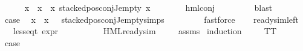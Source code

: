 \begin{isabellebody}
\ \ \ \ \isamarkupfalse%
\ {\isachardoublequoteopen}{\isasymforall}x\ {\isasymin}\ x{}\ {\isacharbackquote}{\kern0pt}\ x{}{\isachardot}{\kern0pt}\ stacked{\isacharunderscore}{\kern0pt}pos{\isacharunderscore}{\kern0pt}conj{\isacharunderscore}{\kern0pt}J{\isacharunderscore}{\kern0pt}empty\ x{\isachardoublequoteclose}\isanewline
\ \ \ \ \ \ \isamarkupfalse%
\ hml{\isacharunderscore}{\kern0pt}conj\ \isanewline
\ \ \ \ \ \ \isamarkupfalse%
\ blast\isanewline
\ \ \ \ \isamarkupfalse%
\ \isamarkupfalse%
\ {\isacharquery}{\kern0pt}case\ \isamarkupfalse%
\ {\isacartoucheopen}x{}\ {\isacharbackquote}{\kern0pt}\ x{}\ {\isacharequal}{\kern0pt}\ {\isacharbraceleft}{\kern0pt}{\isacharbraceright}{\kern0pt}{\isacartoucheclose}\ stacked{\isacharunderscore}{\kern0pt}pos{\isacharunderscore}{\kern0pt}conj{\isacharunderscore}{\kern0pt}J{\isacharunderscore}{\kern0pt}empty{\isachardot}{\kern0pt}simps\ \isanewline
\ \ \ \ \ \ \isamarkupfalse%
\ fastforce\isanewline
\ \ \isamarkupfalse%
\isanewline
{}\isamarkupfalse%
%
\endisatagproof
{\isafoldproof}%
%
\isadelimproof
\isanewline
%
\endisadelimproof
\isanewline
{}\isamarkupfalse%
\ ready{\isacharunderscore}{\kern0pt}sim{\isacharunderscore}{\kern0pt}left{\isacharcolon}{\kern0pt}\isanewline
\ \ \ {\isachardoublequoteopen}less{\isacharunderscore}{\kern0pt}eq{\isacharunderscore}{\kern0pt}t\ {\isacharparenleft}{\kern0pt}expr\ {\isasymphi}{\isacharparenright}{\kern0pt}\ {\isacharparenleft}{\kern0pt}{\isasyminfinity}{\isacharcomma}{\kern0pt}\ {\isasyminfinity}{\isacharcomma}{\kern0pt}\ {\isasyminfinity}{\isacharcomma}{\kern0pt}\ {\isasyminfinity}{\isacharcomma}{\kern0pt}\ {}{\isacharcomma}{\kern0pt}\ {}{\isacharparenright}{\kern0pt}{\isachardoublequoteclose}\isanewline
\ \ \ {\isachardoublequoteopen}HML{\isacharunderscore}{\kern0pt}ready{\isacharunderscore}{\kern0pt}sim\ {\isasymphi}{\isachardoublequoteclose}\isanewline
%
\isadelimproof
\ \ %
\endisadelimproof
%
\isatagproof
{}\isamarkupfalse%
\ assms\isanewline
{}\isamarkupfalse%
\ {\isacharparenleft}{\kern0pt}induction\ {\isasymphi}{\isacharparenright}{\kern0pt}\isanewline
\ \ \isamarkupfalse%
\ TT\isanewline
\ \ \isamarkupfalse%
\ \isamarkupfalse%
\ {\isacharquery}{\kern0pt}case\ \isanewline
\ \ \ \ \isamarkupfalse%

\end{isabellebody}
